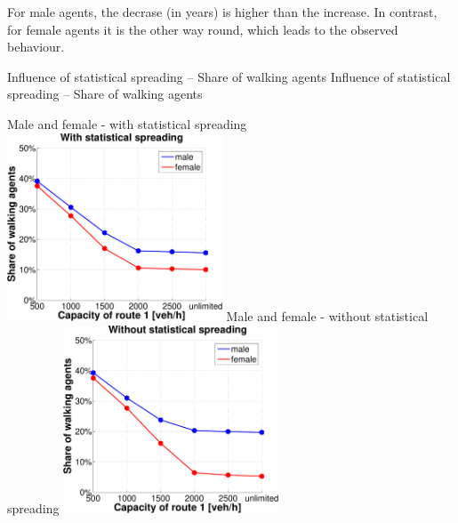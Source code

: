 For male agents, the decrase (in years) is higher than the increase. In contrast, for female agents it is the other way round, which leads to the observed behaviour.

\createfigure%
{Influence of statistical spreading -- Share of walking agents}%
{Influence of statistical spreading -- Share of walking agents}%
{\label{fig:statisticalSpreadingShareWalkingAgents}}%
{%
  \createsubfigure%
  {Male and female - with statistical spreading}%
  {\includegraphics[width=0.48\textwidth, angle=0, trim=0mm 0mm 0mm 9mm, clip=true]{extending/figures/MultiModalSimulation/simulations/MaleAndFemaleWith}}%
  {\label{}}%
  {\hspace{3mm}}%
  \createsubfigure%
  {Male and female - without statistical spreading}%
  {\includegraphics[width=0.48\textwidth, angle=0, trim=0mm 0mm 0mm 9mm, clip=true]{extending/figures/MultiModalSimulation/simulations/MaleAndFemaleWithout}}%
  {\label{}}%
  {\vspace{5mm}}%

}
